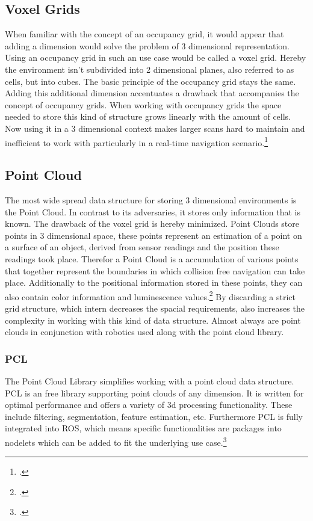 \subsection{Voxel Grids}

When familiar with the concept of an occupancy grid, it would appear that adding a dimension would solve the problem of 3 dimensional representation.
Using an occupancy grid in such an use case would be called a voxel grid. Hereby the environment isn't subdivided into 2 dimensional planes, also referred to as cells, but into cubes. The basic principle of the occupancy grid stays the same. Adding this additional dimension accentuates a drawback that accompanies the concept of occupancy grids. When working with occupancy grids the space needed to store this kind of structure grows linearly with the amount of cells. Now using it in a 3 dimensional context makes larger scans hard to maintain and inefficient to work with particularly in a real-time navigation scenario.\footcite{uni-freiburgOccupancyGridMaps2020}

\subsection{Point Cloud}
The most wide spread data structure for storing 3 dimensional environments is the Point Cloud. In contrast to its adversaries, it stores only information that is known. The drawback of the voxel grid is hereby minimized. Point Clouds store points in 3 dimensional space, these points represent an estimation of a point on a surface of an object, derived from sensor readings and the position these readings took place. Therefor a Point Cloud is a accumulation of various points that together represent the boundaries in which collision free navigation can take place.
Additionally to the positional information stored in these points, they can also contain color information and luminescence values.\footcite{tech27PointCloud2018}\newline
By discarding a strict grid structure, which intern decreases the spacial requirements, also increases the complexity in working with this kind of data structure. Almost always are point clouds in conjunction with robotics used along with the point cloud library.

\subsubsection{PCL}
The Point Cloud Library simplifies working with a point cloud data structure. PCL is an free library supporting point clouds of any dimension. It is written for optimal performance and offers a variety of 3d processing functionality. These include filtering, segmentation, feature estimation, etc. Furthermore PCL is fully integrated into ROS, which means specific functionalities are packages into nodelets which can be added to fit the underlying use case.\footcite{ConselhoNacionaldeDesenvolvimentoCientificoeTecnologico1995}

